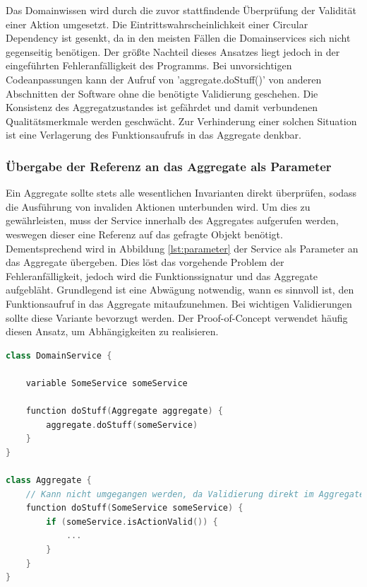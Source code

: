 \pagebreak

Das Domainwissen wird durch die zuvor stattfindende Überprüfung der Validität einer Aktion umgesetzt. Die Eintrittswahrscheinlichkeit einer Circular Dependency ist gesenkt, da in den meisten Fällen die Domainservices sich nicht gegenseitig benötigen. Der größte Nachteil dieses Ansatzes liegt jedoch in der eingeführten Fehleranfälligkeit des Programms. Bei unvorsichtigen Codeanpassungen kann der Aufruf von 'aggregate.doStuff()' von anderen Abschnitten der Software ohne die benötigte Validierung geschehen. Die Konsistenz des Aggregatzustandes ist gefährdet und damit verbundenen Qualitätsmerkmale werden geschwächt. Zur Verhinderung einer solchen Situation ist eine Verlagerung des Funktionsaufrufs in das Aggregate denkbar.

\subsubsection{Übergabe der Referenz an das Aggregate als Parameter}

Ein Aggregate sollte stets alle wesentlichen Invarianten direkt überprüfen, sodass die Ausführung von invaliden Aktionen unterbunden wird. Um dies zu gewährleisten, muss der Service innerhalb des Aggregates aufgerufen werden, weswegen dieser eine Referenz auf das gefragte Objekt benötigt. Dementsprechend wird in Abbildung \ref{lst:parameter} der Service als Parameter an das Aggregate übergeben. Dies löst das vorgehende Problem der Fehleranfälligkeit, jedoch wird die Funktionssignatur und das Aggregate aufgebläht. Grundlegend ist eine Abwägung notwendig, wann es sinnvoll ist, den Funktionsaufruf in das Aggregate mitaufzunehmen. Bei wichtigen Validierungen sollte diese Variante bevorzugt werden. Der Proof-of-Concept verwendet häufig diesen Ansatz, um Abhängigkeiten zu realisieren.

\vspace{0.5cm}
\begin{minipage}{\linewidth} %
	\begin{lstlisting}[caption={Übergabe der Referenz an das Aggregate als Parameter}, label={lst:parameter}, language=Kotlin]
class DomainService {
	
	variable SomeService someService
	
	function doStuff(Aggregate aggregate) {
		aggregate.doStuff(someService)
	}
}

class Aggregate {
	// Kann nicht umgegangen werden, da Validierung direkt im Aggregate geschieht
	function doStuff(SomeService someService) {
		if (someService.isActionValid()) {
			...
		}
	}
}
	\end{lstlisting}
\end{minipage}

